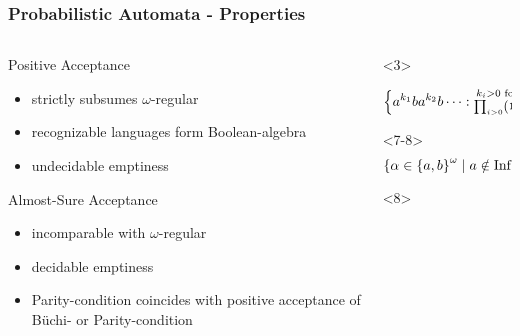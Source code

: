 \documentclass{beamer}
\begin{document}
  \begin{frame}
    \frametitle{Probabilistic Automata - Properties}
    \begin{columns}
      \begin{column}{0.5\textwidth}
        \small{Positive Acceptance}
        \begin{itemize}
          \item<2-> \alert<3>{strictly} subsumes $\omega$-regular
          \item<4-> recognizable languages form Boolean-algebra
          \item<5-> undecidable emptiness
        \end{itemize}
        \small{Almost-Sure Acceptance}
        \begin{itemize}
          \item<6-> incomparable with $\omega$-regular
          \item<9-> decidable emptiness
          \item<10-> \alert{Parity-}condition coincides with positive
            acceptance of Büchi- or Parity-condition
        \end{itemize}
      \end{column}
      \begin{column}{0.5\textwidth}
        \begin{overlayarea}{\textwidth}{\textheight}
          \begin{onlyenv}<3>
            \begin{uncoverenv}
              \vspace{3cm}
              \begin{equation*}
                \left\{
                  a^{k_{1}}ba^{k_{2}}b\dots:
                  \substack{k_{i}>0\text{ for all }i>0,\\
                  \prod_{i>0}\left(1-\frac{1}{2}^{k_{i}}\right) > 0}
                \right\}
              \end{equation*}
            \end{uncoverenv}
          \end{onlyenv}
          \begin{onlyenv}<7-8>
            \vspace{0.2\textheight}
            \begin{equation*}
              \left\{\alpha\in\left\{a,b\right\}^{\omega}\mid a\notin\operatorname{Inf}(\alpha)\right\}
            \end{equation*}
            \vfill
            \begin{uncoverenv}<8>

\end{uncoverenv}
\end{onlyenv}
\end{overlayarea}
\end{column}
\end{columns}
\end{frame}
\end{document}
